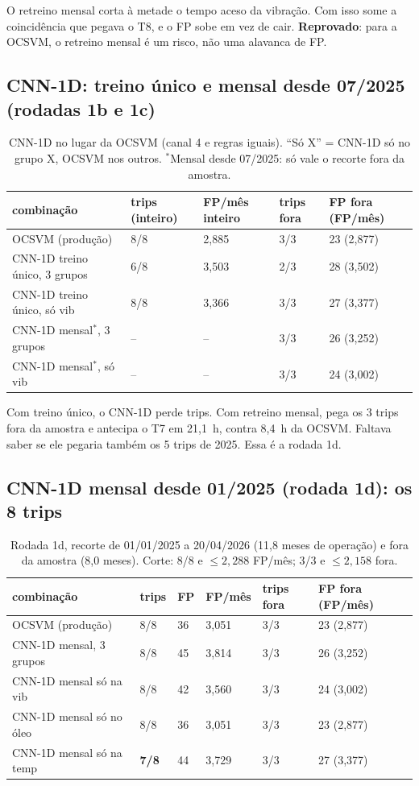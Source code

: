 \documentclass[11pt,a4paper]{article}
\begin{document}
O retreino mensal corta à metade o tempo aceso da vibração. Com isso some a coincidência que pegava o T8, e o FP
sobe em vez de cair. \textbf{Reprovado}: para a OCSVM, o retreino mensal é um risco, não uma alavanca de FP.

\subsection{CNN-1D: treino único e mensal desde 07/2025 (rodadas 1b e 1c)}

\begin{table}[H]
\centering\small
\caption{CNN-1D no lugar da OCSVM (canal 4 e regras iguais). ``Só X'' = CNN-1D só no grupo X, OCSVM nos outros.
$^*$Mensal desde 07/2025: só vale o recorte fora da amostra.}
\label{tab:1bc}
\begin{tabular}{lllll}
\toprule
combinação & trips (inteiro) & FP/mês inteiro & trips fora & FP fora (FP/mês) \\
\midrule
OCSVM (produção) & 8/8 & 2,885 & 3/3 & 23 (2,877) \\
CNN-1D treino único, 3 grupos & 6/8 & 3,503 & 2/3 & 28 (3,502) \\
CNN-1D treino único, só vib & 8/8 & 3,366 & 3/3 & 27 (3,377) \\
CNN-1D mensal$^*$, 3 grupos & -- & -- & 3/3 & 26 (3,252) \\
CNN-1D mensal$^*$, só vib & -- & -- & 3/3 & 24 (3,002) \\
\bottomrule
\end{tabular}
\end{table}

Com treino único, o CNN-1D perde trips. Com retreino mensal, pega os 3 trips fora da amostra e antecipa o T7 em
21,1~h, contra 8,4~h da OCSVM. Faltava saber se ele pegaria também os 5 trips de 2025. Essa é a rodada 1d.

\subsection{CNN-1D mensal desde 01/2025 (rodada 1d): os 8 trips}
\label{sec:1d}

\begin{table}[H]
\centering\small
\caption{Rodada 1d, recorte de 01/01/2025 a 20/04/2026 (11,8 meses de operação) e fora da amostra (8,0 meses).
Corte: 8/8 e $\leq 2{,}288$ FP/mês; 3/3 e $\leq 2{,}158$ fora.}
\label{tab:1d}
\begin{tabular}{llllll}
\toprule
combinação & trips & FP & FP/mês & trips fora & FP fora (FP/mês) \\
\midrule
OCSVM (produção) & 8/8 & 36 & 3,051 & 3/3 & 23 (2,877) \\
CNN-1D mensal, 3 grupos & 8/8 & 45 & 3,814 & 3/3 & 26 (3,252) \\
CNN-1D mensal só na vib & 8/8 & 42 & 3,560 & 3/3 & 24 (3,002) \\
CNN-1D mensal só no óleo & 8/8 & 36 & 3,051 & 3/3 & 23 (2,877) \\
CNN-1D mensal só na temp & \textbf{7/8} & 44 & 3,729 & 3/3 & 27 (3,377) \\
\bottomrule
\end{tabular}
\end{table}
\end{document}
